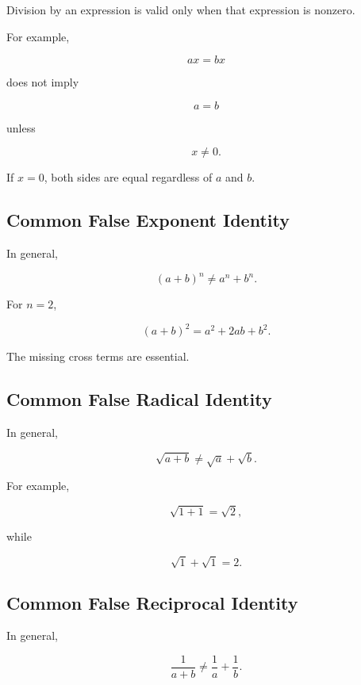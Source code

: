 Division by an expression is valid only when that expression is nonzero.

For example,

\[
ax=bx
\]

does not imply

\[
a=b
\]

unless

\[
\boxed{
x\neq0.
}
\]

If \(x=0\), both sides are equal regardless of \(a\) and \(b\).

\subsection{Common False Exponent Identity}
\label{subsec:false-exponent-sum}

In general,

\[
\boxed{
(a+b)^n
\neq
a^n+b^n.
}
\]

For \(n=2\),

\[
(a+b)^2
=
a^2+2ab+b^2.
\]

The missing cross terms are essential.

\subsection{Common False Radical Identity}
\label{subsec:false-radical-sum}

In general,

\[
\boxed{
\sqrt{a+b}
\neq
\sqrt a+\sqrt b.
}
\]

For example,

\[
\sqrt{1+1}
=
\sqrt2,
\]

while

\[
\sqrt1+\sqrt1=2.
\]

\subsection{Common False Reciprocal Identity}
\label{subsec:false-reciprocal-sum}

In general,

\[
\boxed{
\frac1{a+b}
\neq
\frac1a+\frac1b.
}
\]

